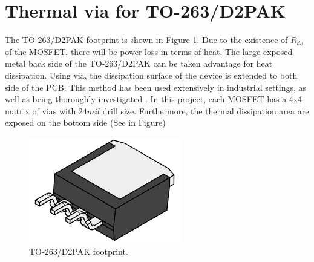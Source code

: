 \documentclass[../main.tex]{subfiles}
\begin{document}
    \section{Thermal via for TO-263/D2PAK}
    The TO-263/D2PAK footprint is shown in Figure \ref{fig:d2pak}. Due to the existence of $R_{ds}$ of the MOSFET, there will be power loss in terms of heat. The large exposed metal back side of the TO-263/D2PAK can be taken advantage for heat dissipation. Using via, the dissipation surface of the device is extended to both side of the PCB. This method has been used extensively in industrial settings, as well as being thoroughly investigated \cite{InfineonD2PAKThermal}. In this project, each MOSFET has a 4x4 matrix of vias with $24mil$ drill size. Furthermore, the thermal dissipation area are exposed on the bottom side (See in Figure)
    \begin{figure}[!h]
        \centerline{\includegraphics[width=0.5\linewidth]{media/d2pak_footprint.png}}
        \caption{TO-263/D2PAK footprint.}
        \label{fig:d2pak}
    \end{figure}
\end{document}
